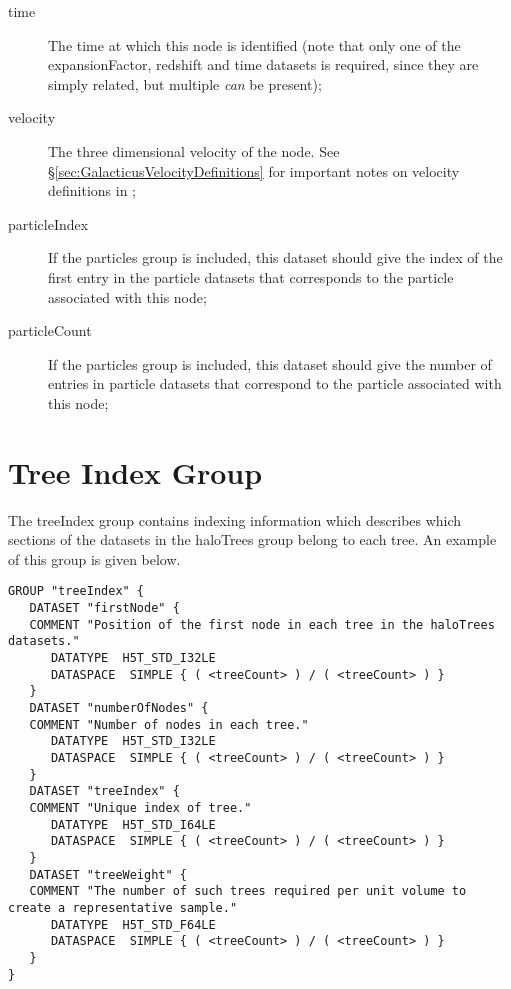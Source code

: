 \begin{description}
 \item [{\normalfont \ttfamily time}] The time at which this node is identified (note that only one of the {\normalfont \ttfamily expansionFactor}, {\normalfont \ttfamily redshift} and {\normalfont \ttfamily time} datasets is required, since they are simply related, but multiple \emph{can} be present);
 \item [{\normalfont \ttfamily velocity}] The three dimensional velocity of the node. See \S\ref{sec:GalacticusVelocityDefinitions} for important notes on velocity definitions in \glc;
 \item [{\normalfont \ttfamily particleIndex}] If the {\normalfont \ttfamily particles} group is included, this dataset should give the index of the first entry in the particle datasets that corresponds to the particle associated with this node;
 \item [{\normalfont \ttfamily particleCount}] If the {\normalfont \ttfamily particles} group is included, this dataset should give the number of entries in particle datasets that correspond to the particle associated with this node;
\end{description}

\section{Tree Index Group}

The {\normalfont \ttfamily treeIndex} group contains indexing information which describes which sections of the datasets in the {\normalfont \ttfamily haloTrees} group belong to each tree. An example of this group is given below.

\begin{verbatim}
GROUP "treeIndex" {
   DATASET "firstNode" {
   COMMENT "Position of the first node in each tree in the haloTrees datasets."
      DATATYPE  H5T_STD_I32LE
      DATASPACE  SIMPLE { ( <treeCount> ) / ( <treeCount> ) }
   }
   DATASET "numberOfNodes" {
   COMMENT "Number of nodes in each tree."
      DATATYPE  H5T_STD_I32LE
      DATASPACE  SIMPLE { ( <treeCount> ) / ( <treeCount> ) }
   }
   DATASET "treeIndex" {
   COMMENT "Unique index of tree."
      DATATYPE  H5T_STD_I64LE
      DATASPACE  SIMPLE { ( <treeCount> ) / ( <treeCount> ) }
   }
   DATASET "treeWeight" {
   COMMENT "The number of such trees required per unit volume to create a representative sample."
      DATATYPE  H5T_STD_F64LE
      DATASPACE  SIMPLE { ( <treeCount> ) / ( <treeCount> ) }
   }
}
\end{verbatim}


